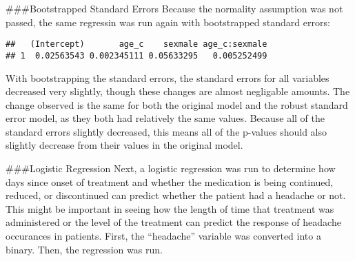 \documentclass[]{article}
\newenvironment{Shaded}{\begin{snugshade}}{\end{snugshade}}
\newcommand{\DataTypeTok}[1]{\textcolor[rgb]{0.13,0.29,0.53}{#1}}
\newcommand{\DecValTok}[1]{\textcolor[rgb]{0.00,0.00,0.81}{#1}}
\newcommand{\KeywordTok}[1]{\textcolor[rgb]{0.13,0.29,0.53}{\textbf{#1}}}
\newcommand{\NormalTok}[1]{#1}
\newcommand{\OperatorTok}[1]{\textcolor[rgb]{0.81,0.36,0.00}{\textbf{#1}}}
\newcommand{\StringTok}[1]{\textcolor[rgb]{0.31,0.60,0.02}{#1}}
\begin{document}
\#\#\#Bootstrapped Standard Errors Because the normality assumption was
not passed, the same regressin was run again with bootstrapped standard
errors:

\begin{Shaded}
\end{Shaded}

\begin{verbatim}
##   (Intercept)       age_c    sexmale age_c:sexmale
## 1  0.02563543 0.002345111 0.05633295   0.005252499
\end{verbatim}

With bootstrapping the standard errors, the standard errors for all
variables decreased very slightly, though these changes are almost
negligable amounts. The change observed is the same for both the
original model and the robust standard error model, as they both had
relatively the same values. Because all of the standard errors slightly
decreased, this means all of the p-values should also slightly decrease
from their values in the original model.

\#\#\#Logistic Regression Next, a logistic regression was run to
determine how days since onset of treatment and whether the medication
is being continued, reduced, or discontinued can predict whether the
patient had a headache or not. This might be important in seeing how the
length of time that treatment was administered or the level of the
treatment can predict the response of headache occurances in patients.
First, the ``headache'' variable was converted into a binary. Then, the
regression was run.
\end{document}
